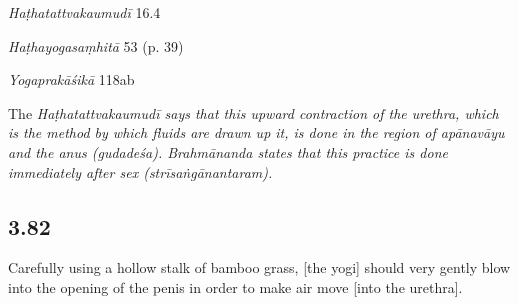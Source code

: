 \begin{ekdosis}

\begin{testimonia}[hp03_081]
\emph{Haṭhatattvakaumudī} 16.4
\begin{versinnote}
\end{versinnote}

\emph{Haṭhayogasaṃhitā} 53 (p. 39)
\begin{versinnote}
\end{versinnote}


\emph{Yogaprakāśikā} 118ab
\begin{versinnote}
\end{versinnote}
\end{testimonia}

\begin{philcomm}[hp03_081]
 The \sl{Haṭhatattvakaumudī} says that this upward contraction of the urethra, which is the method by which fluids are drawn up it, is done in the region of \emph{apānavāyu} and the anus (\emph{gudadeśa}). Brahmānanda states that this practice is done immediately after sex (\emph{strīsaṅgānantaram}).
\end{philcomm}

\subsection*{3.82}
\begin{translation}[hp03_082]
Carefully using a hollow stalk of bamboo grass, [the yogi] should very gently blow into the opening of the penis in order to make air move [into the urethra].
\end{translation}


\end{ekdosis}
